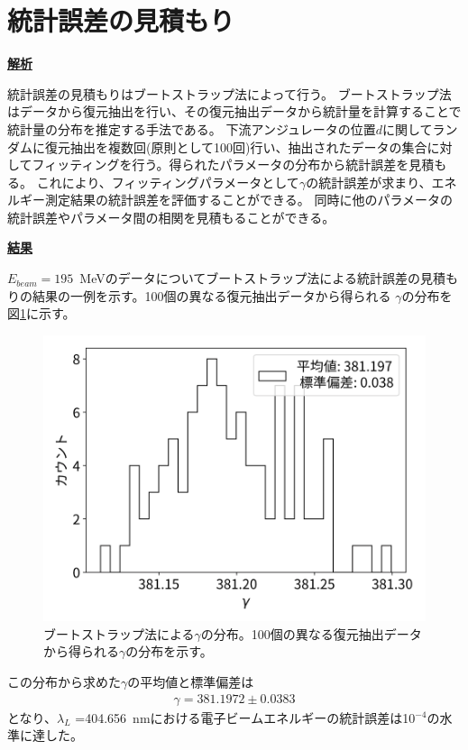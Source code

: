 \documentclass[a4paper,11pt,uplatex]{jsbook}
\begin{document}
\section{統計誤差の見積もり}
\noindent \textbf{\underline{解析}}\par
統計誤差の見積もりはブートストラップ法によって行う。
ブートストラップ法はデータから復元抽出を行い、その復元抽出データから統計量を計算することで統計量の分布を推定する手法である。
下流アンジュレータの位置$d$に関してランダムに復元抽出を複数回(原則として100回)行い、抽出されたデータの集合に対してフィッティングを行う。得られたパラメータの分布から統計誤差を見積もる。
これにより、フィッティングパラメータとして$\gamma$の統計誤差が求まり、エネルギー測定結果の統計誤差を評価することができる。
同時に他のパラメータの統計誤差やパラメータ間の相関を見積もることができる。

\noindent \textbf{\underline{結果}}\par
$E_{beam} =195$~MeVのデータについてブートストラップ法による統計誤差の見積もりの結果の一例を示す。100個の異なる復元抽出データから得られる
$\gamma$の分布を図\ref{gamm_hist}に示す。
\begin{figure}[h]
  \centering
  \includegraphics[width=0.8\linewidth]{image/4-gammahist.png}
  \caption[ブートストラップ法による$\gamma$の分布]{ブートストラップ法による$\gamma$の分布。100個の異なる復元抽出データから得られる$\gamma$の分布を示す。} \label{gamm_hist}
\end{figure}

この分布から求めた$\gamma$の平均値と標準偏差は
\begin{eqnarray}
  \gamma = 381.1972 \pm 0.0383
\end{eqnarray}
となり、$\lambda_L$ =404.656~nmにおける電子ビームエネルギーの統計誤差は10$^{-4}$の水準に達した。
\end{document}
